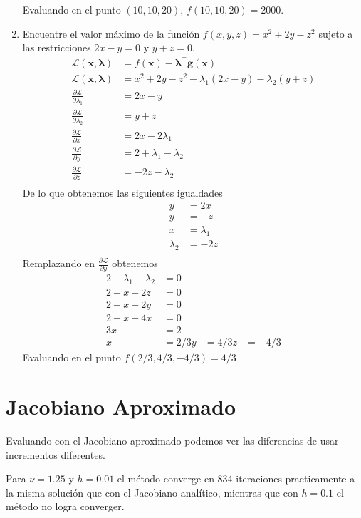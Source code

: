 \documentclass{article}
\begin{document}
\begin{multicols}{2}
\begin{enumerate}
Evaluando en el punto $(10, 10, 20)$, $f(10, 10, 20) = 2000$.

\item Encuentre el valor máximo de la función $f(x, y, z) = x^2 + 2y - z^2$ sujeto a las restricciones $2x - y = 0$ y $y + z = 0$.
\begin{align*}
\mathcal{L}(\boldsymbol{x}, \boldsymbol{\lambda}) &= f(\boldsymbol{x}) - \boldsymbol{\lambda}^\intercal \boldsymbol{g}(\boldsymbol{x})\\
\mathcal{L}(\boldsymbol{x}, \boldsymbol{\lambda}) &= x^2+2y-z^2 -\lambda_1(2x-y) - \lambda_2(y+z)\\
\frac{\partial\mathcal{L}}{\partial \lambda_1} &= 2x-y\\
\frac{\partial\mathcal{L}}{\partial \lambda_2} &= y+z\\
\frac{\partial\mathcal{L}}{\partial x} &= 2x-2\lambda_1\\
\frac{\partial\mathcal{L}}{\partial y} &= 2+\lambda_1-\lambda_2\\
\frac{\partial\mathcal{L}}{\partial z} &= -2z-\lambda_2\\
\end{align*}
De lo que obtenemos las siguientes igualdades
\begin{align*}
y &=2x\\
y &=-z\\
x &=\lambda_1\\
\lambda_2 &= -2z\\
\end{align*}
Remplazando en $\frac{\partial\mathcal{L}}{\partial y}$ obtenemos
\begin{align*}
2+\lambda_1 - \lambda_2 &= 0\\
2+x + 2z &= 0\\
2+x - 2y &= 0\\
2+x - 4x &= 0\\
3x &= 2\\
x &= 2/3
y &= 4/3
z &= -4/3
\end{align*}
Evaluando en el punto $f(2/3, 4/3, -4/3) = 4/3$
\end{enumerate}

\section{Jacobiano Aproximado}

Evaluando con el Jacobiano aproximado podemos ver las diferencias de usar incrementos diferentes.

Para $\nu = 1.25$ y $h = 0.01$ el método converge en 834 iteraciones practicamente a la misma solución que con el Jacobiano analítico, mientras que con $h = 0.1$ el método no logra converger.


\end{multicols}
\end{document}
